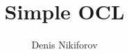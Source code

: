 \documentclass[11pt,a4paper]{book}
\makeatletter
\newenvironment{abstract}{%
  \small
  \begin{center}%
    {\bfseries \abstractname\vspace{-.5em}\vspace{\z@}}%
  \end{center}%
  \quotation}{\endquotation}
\makeatother
\begin{document}
\title{Simple OCL}
\author{Denis Nikiforov}
\maketitle


\tableofcontents





\end{document}

